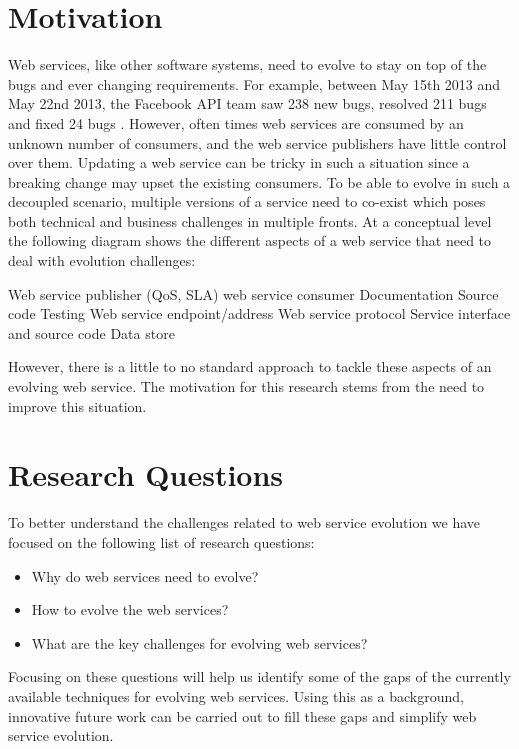 \documentclass[runningheads,a4paper]{llncs}
\begin{document}
\section{Motivation} %
\label{sec:motivation}
Web services, like other software systems, need to evolve to stay on top of the bugs and ever changing requirements. For example, between May 15th 2013 and May 22nd 2013, the Facebook API team saw 238 new bugs, resolved 211 bugs and fixed 24 bugs \cite{facebook_release_note}. However, often times web services are consumed by an unknown number of consumers, and the web service publishers have little control over them. Updating a web service can be tricky in such a situation since a breaking change may upset the existing consumers. To be able to evolve in such a decoupled scenario, multiple versions of a service need to co-exist which poses both technical and business challenges in multiple fronts. At a conceptual level the following diagram shows the different aspects of a web service that need to deal with evolution challenges:

Web service publisher (QoS, SLA)  web service consumer
Documentation                   Source code
Testing
Web service endpoint/address
Web service protocol
Service interface and source code
Data store

However, there is a little to no standard approach to tackle these aspects of an evolving web service. The motivation for this research stems from the need to improve this situation.


\section{Research Questions} %
\label{sec:research_questions}
To better understand the challenges related to web service evolution we have focused on the following list of research questions:

\begin{itemize}
  \item Why do web services need to evolve?
  \item How to evolve the web services?
  \item What are the key challenges for evolving web services?
\end{itemize}

Focusing on these questions will help us identify some of the gaps of the currently available techniques for evolving web services. Using this as a background, innovative future work can be carried out to fill these gaps and simplify web service evolution.
\end{document}
